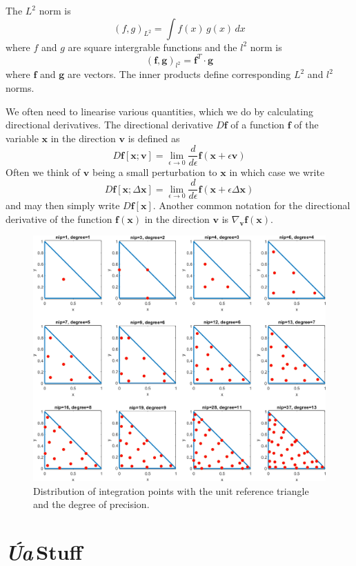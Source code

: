 \documentclass[10pt,a4paper]{book}
\newcommand{\Ua}{\textsl{\'Ua}\,}
\begin{document}
The $L^2$ norm is 
\[
 (f,g)_{L^2} = \int f(x) \, g(x) \, dx
 \]
 where $f$ and $g$ are square intergrable functions and the $l^2$ norm
 is
\[
(\bm{f}, \bm{g} )_{l^2} = \bm{f}^T \cdot \bm{g}
\]
where $\bm{f}$ and $\bm{g}$ are vectors. The inner products define
corresponding $L^2$ and $l^2$ norms.

We often need to linearise various quantities, which we do by
calculating directional derivatives. The directional derivative $D \bm{f}$ of a
function $\bm{f}$ of the variable $\bm{x}$ in the direction $\bm{v}$ is defined as
\[
  D \bm{f}[\bm{x} ; \bm{v}] = \lim_{\epsilon \to 0} \frac{d}{d \epsilon} \bm{f}(\bm{x}+\epsilon \bm{v})
\]
Often we think of $\bm{v}$ being a small perturbation to $\bm{x}$ in which case we write
\[
  D \bm{f}[\bm{x} ; \Delta \bm{x}] = \lim_{\epsilon \to 0} \frac{d}{d \epsilon} \bm{f}(\bm{x}+\epsilon \Delta \bm{x})
\]
and may then simply write $D \bm{f}[\bm{x}]$.  Another common notation for the
directional derivative of the function $\bm{f}(\bm{x})$ in the
direction $\bm{v}$ is $\nabla_{\bm{v}} \bm{f}(\bm{x})$.
  



\begin{figure}
\centerline{\includegraphics[width=12cm]{DistributionOfIntegrationPoints.png}}
\caption{Distribution of integration points with the unit reference triangle and the degree of precision.
\label{fig:dint}}
\end{figure}





\mainmatter
\part{\Ua Stuff}
\end{document}
